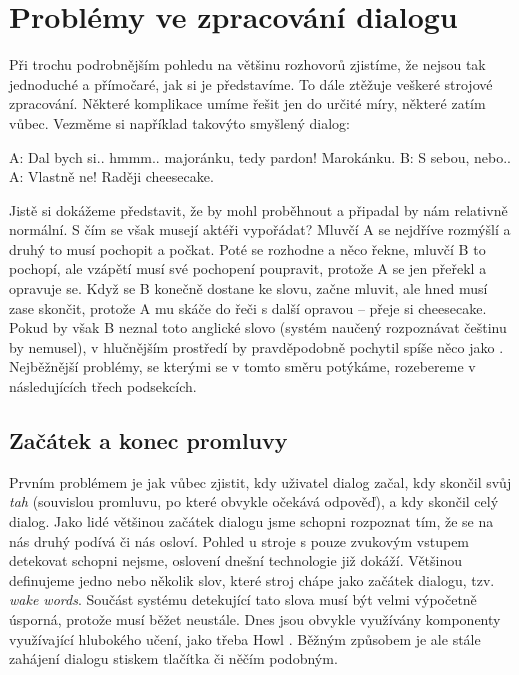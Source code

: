 \section{Problémy ve zpracování dialogu}

Při trochu podrobnějším pohledu na většinu rozhovorů zjistíme, že nejsou
tak jednoduché a přímočaré, jak si je představíme. To dále ztěžuje
veškeré strojové zpracování. Některé komplikace umíme řešit jen do určité
míry, některé zatím vůbec. Vezměme si například takovýto smyšlený dialog:

\begin{code}
    A: Dal bych si.. hmmm.. majoránku, tedy pardon! Marokánku.
    B: S sebou, nebo..
    A: Vlastně ne! Raději cheesecake.
\end{code}

Jistě si dokážeme představit, že by mohl proběhnout a připadal by nám
relativně normální. S čím se však musejí aktéři vypořádat? Mluvčí A se
nejdříve rozmýšlí a druhý to musí pochopit a počkat. Poté se rozhodne
a něco řekne, mluvčí B to pochopí, ale vzápětí musí své pochopení
poupravit, protože A se jen přeřekl a opravuje se. Když se B konečně
dostane ke slovu, začne mluvit, ale hned musí zase skončit, protože
A mu skáče do řeči s další opravou -- přeje si cheesecake. Pokud by
však B neznal toto anglické slovo (systém naučený rozpoznávat češtinu
by nemusel), v hlučnějším prostředí by pravděpodobně pochytil spíše
něco jako . Nejběžnější problémy, se kterými se v tomto
směru potýkáme, rozebereme v následujících třech podsekcích.

\subsection{Začátek a konec promluvy}

Prvním problémem je jak vůbec zjistit, kdy uživatel dialog začal, kdy
skončil svůj \textit{tah} (souvislou promluvu, po které obvykle očekává odpověď),
a kdy skončil celý dialog.
Jako lidé většinou začátek dialogu jsme schopni rozpoznat tím, že se na
nás druhý podívá či nás osloví. Pohled u stroje s pouze zvukovým vstupem
detekovat schopni nejsme, oslovení dnešní technologie již dokáží. Většinou
definujeme jedno nebo několik slov, které stroj chápe jako začátek dialogu,
tzv. \textit{wake words}. Součást systému detekující tato slova musí být velmi
výpočetně úsporná, protože musí běžet neustále. Dnes jsou obvykle
využívány komponenty využívající hlubokého učení, jako třeba Howl
\citep{tang_howl_2020}.
Běžným způsobem je ale stále zahájení dialogu stiskem tlačítka či něčím
podobným.

